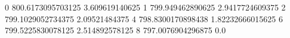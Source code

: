 0 800.6173095703125 3.609619140625
1 799.949462890625 2.9417724609375
2 799.1029052734375 2.09521484375
4 798.8300170898438 1.82232666015625
6 799.5225830078125 2.514892578125
8 797.0076904296875 0.0
